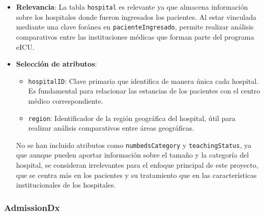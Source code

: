 \documentclass[12pt, a4paper, twoside]{article}
\begin{document}
	\begin{itemize}
		\item \textbf{Relevancia}: La tabla \texttt{hospital} es relevante ya que almacena información sobre los hospitales donde fueron ingresados los pacientes. Al estar vinculada mediante una clave foránea en \texttt{pacienteIngresado}, permite realizar análisis comparativos entre las instituciones médicas que forman parte del programa eICU.
		
		\item \textbf{Selección de atributos}:
		\begin{itemize}
			\item \texttt{hospitalID}: Clave primaria que identifica de manera única cada hospital. Es fundamental para relacionar las estancias de los pacientes con el centro médico correspondiente.
			\item \texttt{region}: Identificador de la región geográfica del hospital, útil para realizar análisis comparativos entre áreas geográficas.
		\end{itemize}
		
		
		No se han incluido atributos como \texttt{numbedsCategory} y \texttt{teachingStatus}, ya que aunque pueden aportar información sobre el tamaño y la categoría del hospital, se consideran irrelevantes para el enfoque principal de este proyecto, que se centra más en los pacientes y su tratamiento que en las características institucionales de los hospitales. \cite{eICU2024}
		
	\end{itemize}
	
	\subsubsection{AdmissionDx}
	
\end{document}
